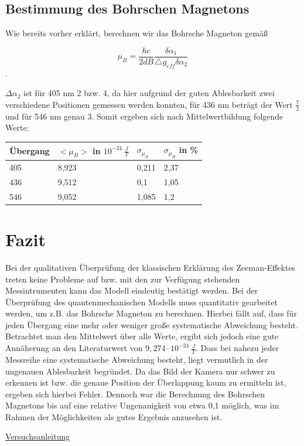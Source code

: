 \documentclass[bigchapter,colorback,accentcolor=tud4b,linedtoc,11pt]{tudreport}
\begin{document}
\section{Bestimmung des Bohrschen Magnetons}

Wie bereits vorher erklärt, berechnen wir das Bohrsche Magneton gemäß

$$\mu_{B}=\frac{hc}{2dB}\frac{\delta\alpha_{1}}{\triangle g_{eff}\delta\alpha_{2}}$$.

$\Delta \alpha_2$ ist für 405 nm 2 bzw. 4, da hier aufgrund der guten Ablesbarkeit zwei verschiedene Positionen gemessen werden konnten, für 436 nm beträgt der Wert $\frac{7}{2}$ und für 546 nm genau 3. Somit ergeben sich nach Mittelwertbildung folgende Werte:

\begin{center}
  \begin{tabular}{|p{2cm}|p{4cm}|p{2cm}|p{2cm}|}
    \hline
    Übergang & $< \mu_B >$ in $10^{-24}~ \frac{J}{T}$ & $\sigma_{\mu_B}$ & $\sigma_{\mu_B}$ in \% \\ \hline
    405      & 8,923                                  & 0,211            & 2,37                   \\ \hline
    436      & 9,512                                  & 0,1              & 1,05                   \\ \hline
    546      & 9,052                                  & 1,085            & 1,2                    \\ \hline
    \end{tabular}
\end{center}

\chapter{Fazit}

Bei der qualitativen Überprüfung der klassischen Erklärung des Zeeman-Effektes treten keine Probleme auf bzw. mit den zur Verfügung stehenden Messintrumenten kann das Modell eindeutig bestätigt werden. Bei der Überprüfung des quantenmechanischen Modells muss quantitativ gearbeitet werden, um z.B. das Bohrsche Magneton zu berechnen. Hierbei fällt auf, dass für jeden Übergang eine mehr oder weniger große systematische Abweichung besteht. Betrachtet man den Mittelwert über alle Werte, ergibt sich jedoch eine gute Annäherung an den Literaturwert von $9,274 \cdot 10^{-24}~ \frac{J}{T}$. Dass bei nahezu jeder Messreihe eine systematische Abweichung besteht, liegt vermutlich in der ungenauen Ablesbarkeit begründet. Da das Bild der Kamera nur schwer zu erkennen ist bzw. die genaue Position der Überlappung kaum zu ermitteln ist, ergeben sich hierbei Fehler. Dennoch war die Berechnung des Bohrschen Magnetons bis auf eine relative Ungenauigkeit von etwa 0,1 möglich, was im Rahmen der Möglichkeiten als gutes Ergebnis anzusehen ist.

\cleardoublepage{}
\newpage
\begin{thebibliography}{100}
   \url{Versuchsanleitung}
\end{thebibliography}
\end{document}
